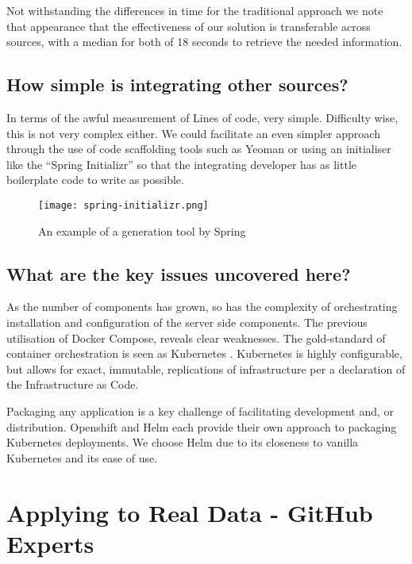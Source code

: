 Not withstanding the differences in time for the traditional approach we note that appearance that the effectiveness of our solution is transferable across sources, with a median for both of 18 seconds to retrieve the needed information.

\subsection{How simple is integrating other sources?}

In terms of the awful measurement of Lines of code, very simple. Difficulty wise, this is not very complex either. We could facilitate an even simpler approach through the use of code scaffolding tools such as Yeoman or using an initialiser like the ``Spring Initializr'' so that the integrating developer has as little boilerplate code to write as possible.

\begin{figure}[h!]
	\centering
	\texttt{[image: spring-initializr.png]}
	\label{fig:springExample}
	\caption{An example of a generation tool by Spring}
\end{figure}

\subsection{What are the key issues uncovered here?}

As the number of components has grown, so has the complexity of orchestrating installation and configuration of the server side components. The previous utilisation of Docker Compose, reveals clear weaknesses. The gold-standard of container orchestration is seen as Kubernetes \parencite{kuberenetesOfficialSite}. Kubernetes is highly configurable, but allows for exact, immutable, replications of infrastructure per a declaration of the Infrastructure as Code.

Packaging any application is a key challenge of facilitating development and, or distribution. Openshift \parencite{openshiftSite} and Helm \parencite{helmOnlineResource} each provide their own approach to packaging Kubernetes deployments. We choose Helm due to its closeness to vanilla Kubernetes and its ease of use. 

\section{Applying to Real Data - GitHub Experts}

